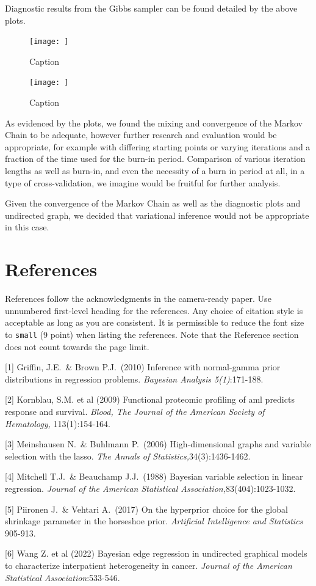 \documentclass{article}
\begin{document}
Diagnostic results from the Gibbs sampler can be found detailed by the above plots. 
\pagebreak
\begin{figure}
    \centering
    \texttt{[image: ]}
    \caption{Caption}
    \label{fig:enter-label}
\end{figure}

\pagebreak
\begin{figure}
    \centering
    \texttt{[image: ]}
    \caption{Caption}
    \label{fig:enter-label}
\end{figure}

As evidenced by the plots, we found the mixing and convergence of the Markov Chain to be adequate, however further research and evaluation would be appropriate, for example with differing starting points or varying iterations and a fraction of the time used for the burn-in period. Comparison of various iteration lengths as well as burn-in, and even the necessity of a burn in period at all, in a type of cross-validation, we imagine would be fruitful for further analysis. 

Given the convergence of the Markov Chain as well as the diagnostic plots and undirected graph, we decided that variational inference would not be appropriate in this case. 

\section*{References}


References follow the acknowledgments in the camera-ready paper. Use unnumbered first-level heading for
the references. Any choice of citation style is acceptable as long as you are
consistent. It is permissible to reduce the font size to \verb+small+ (9 point)
when listing the references.
Note that the Reference section does not count towards the page limit.
\medskip


\small

[1] Griffin, J.E.\ \& Brown P.J.\ (2010) Inference with normal-gamma prior distributions in regression problems. {\it Bayesian Analysis 5(1)}:171-188.

[2] Kornblau, S.M. et al (2009) Functional proteomic profiling of aml predicts response and survival. {\it Blood, The Journal of the American Society of Hematology,} 113(1):154-164.

[3] Meinshausen N.\ \& Buhlmann P.\ (2006) High-dimensional graphs and variable selection with the lasso. {\it The Annals of Statistics,}34(3):1436-1462.

[4] Mitchell T.J.\ \& Beauchamp J.J.\ (1988) Bayesian variable selection in linear regression. {\it Journal of the American Statistical Association,}83(404):1023-1032.

[5] Piironen J.\ \& Vehtari A.\ (2017) On the hyperprior choice for the global shrinkage parameter in the horseshoe prior. {\it Artificial Intelligence and Statistics} 905-913.

[6] Wang Z. et al (2022) Bayesian edge regression in undirected graphical models to characterize interpatient heterogeneity in cancer. {\it Journal of the American Statistical Association}:533-546.
\end{document}
